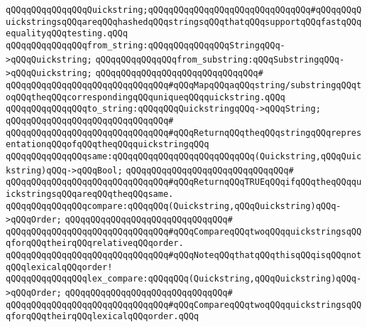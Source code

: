 \verb|qQQqqQQqqQQqqQQqQuickstring;qQQqqQQqqQQqqQQqqQQqqQQqqQQqqQQq#qQQqqQQqQuickstringsqQQqareqQQqhashedqQQqstringsqQQqthatqQQqsupportqQQqfastqQQqequalityqQQqtesting.qQQq|\newline
\newline
\verb|qQQqqQQqqQQqqQQqfrom_string:qQQqqQQqqQQqqQQqStringqQQq->qQQqQuickstring;|\newline
\verb|qQQqqQQqqQQqqQQqfrom_substring:qQQqSubstringqQQq->qQQqQuickstring;|\newline
\verb|qQQqqQQqqQQqqQQqqQQqqQQqqQQqqQQq#|\newline
\verb|qQQqqQQqqQQqqQQqqQQqqQQqqQQqqQQq#qQQqMapqQQqaqQQqstring/substringqQQqtoqQQqtheqQQqcorrespondingqQQquniqueqQQqquickstring.qQQq|\newline
\newline
\verb|qQQqqQQqqQQqqQQqto_string:qQQqqQQqQuickstringqQQq->qQQqString;|\newline
\verb|qQQqqQQqqQQqqQQqqQQqqQQqqQQqqQQq#|\newline
\verb|qQQqqQQqqQQqqQQqqQQqqQQqqQQqqQQq#qQQqReturnqQQqtheqQQqstringqQQqrepresentationqQQqofqQQqtheqQQqquickstringqQQq|\newline
\newline
\verb|qQQqqQQqqQQqqQQqsame:qQQqqQQqqQQqqQQqqQQqqQQqqQQq(Quickstring,qQQqQuickstring)qQQq->qQQqBool;|\newline
\verb|qQQqqQQqqQQqqQQqqQQqqQQqqQQqqQQq#|\newline
\verb|qQQqqQQqqQQqqQQqqQQqqQQqqQQqqQQq#qQQqReturnqQQqTRUEqQQqifqQQqtheqQQqquickstringsqQQqareqQQqtheqQQqsame.|\newline
\newline
\verb|qQQqqQQqqQQqqQQqcompare:qQQqqQQq(Quickstring,qQQqQuickstring)qQQq->qQQqOrder;|\newline
\verb|qQQqqQQqqQQqqQQqqQQqqQQqqQQqqQQq#|\newline
\verb|qQQqqQQqqQQqqQQqqQQqqQQqqQQqqQQq#qQQqCompareqQQqtwoqQQqquickstringsqQQqforqQQqtheirqQQqrelativeqQQqorder.|\newline
\verb|qQQqqQQqqQQqqQQqqQQqqQQqqQQqqQQq#qQQqNoteqQQqthatqQQqthisqQQqisqQQqnotqQQqlexicalqQQqorder!|\newline
\newline
\verb|qQQqqQQqqQQqqQQqlex_compare:qQQqqQQq(Quickstring,qQQqQuickstring)qQQq->qQQqOrder;|\newline
\verb|qQQqqQQqqQQqqQQqqQQqqQQqqQQqqQQq#|\newline
\verb|qQQqqQQqqQQqqQQqqQQqqQQqqQQqqQQq#qQQqCompareqQQqtwoqQQqquickstringsqQQqforqQQqtheirqQQqlexicalqQQqorder.qQQq|\newline
